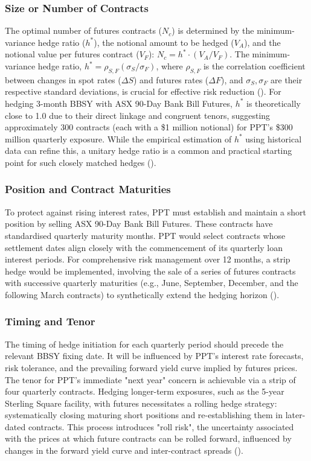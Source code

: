 \documentclass[11pt, a4paper, british]{article}
\begin{document}
\subsubsection{Size or Number of Contracts}
The optimal number of futures contracts ($N_c$) is determined by the minimum-variance hedge ratio ($h^*$), the notional amount to be hedged ($V_A$), and the notional value per futures contract ($V_F$): $N_c = h^* \cdot (V_A / V_F)$. The minimum-variance hedge ratio, $h^{*} = \rho_{S, F} (\sigma_S / \sigma_F)$, where $\rho_{S, F}$ is the correlation coefficient between changes in spot rates ($\Delta S$) and futures rates ($\Delta F$), and $\sigma_S, \sigma_F$ are their respective standard deviations, is crucial for effective risk reduction (\cite{e}). For hedging 3-month BBSY with ASX 90-Day Bank Bill Futures, $h^*$ is theoretically close to 1.0 due to their direct linkage and congruent tenors, suggesting approximately 300 contracts (each with a \$1 million notional) for PPT's \$300 million quarterly exposure. While the empirical estimation of $h^*$ using historical data can refine this, a unitary hedge ratio is a common and practical starting point for such closely matched hedges (\cite{lt}).


\subsubsection{Position and Contract Maturities}
To protect against rising interest rates, PPT must establish and maintain a short position by selling ASX 90-Day Bank Bill Futures. These contracts have standardised quarterly maturity months. PPT would select contracts whose settlement dates align closely with the commencement of its quarterly loan interest periods. For comprehensive risk management over 12 months, a strip hedge would be implemented, involving the sale of a series of futures contracts with successive quarterly maturities (e.g., June, September, December, and the following March contracts) to synthetically extend the hedging horizon (\cite{ch}).

\subsubsection{Timing and Tenor}
The timing of hedge initiation for each quarterly period should precede the relevant BBSY fixing date. It will be influenced by PPT's interest rate forecasts, risk tolerance, and the prevailing forward yield curve implied by futures prices. The tenor for PPT's immediate "next year" concern is achievable via a strip of four quarterly contracts. Hedging longer-term exposures, such as the 5-year Sterling Square facility, with futures necessitates a rolling hedge strategy: systematically closing maturing short positions and re-establishing them in later-dated contracts. This process introduces "roll risk", the uncertainty associated with the prices at which future contracts can be rolled forward, influenced by changes in the forward yield curve and inter-contract spreads (\cite{af}).
\end{document}
